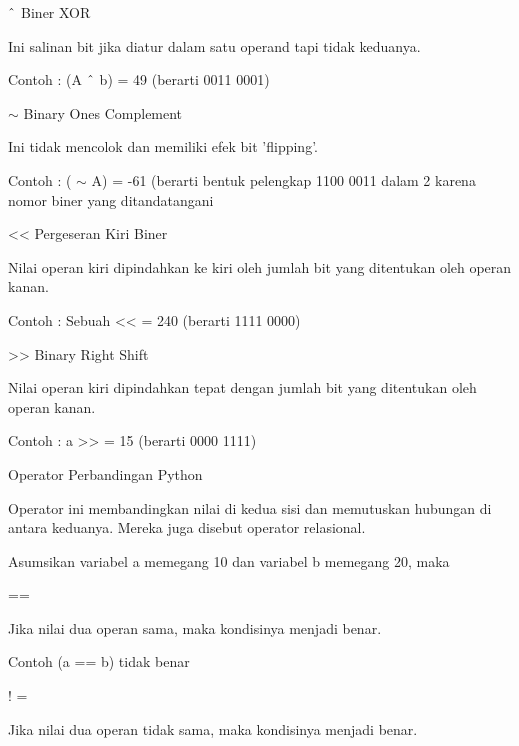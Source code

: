  $  \string^  $ Biner XOR \par
\noindent 
Ini salinan bit jika diatur dalam satu operand tapi tidak keduanya. \par
\noindent 
Contoh : (A  $  \string^  $ b) = 49 (berarti 0011 0001) \par
\vspace{12pt}
\noindent 
 $  \sim  $ Binary Ones Complement \par
\noindent 
Ini tidak mencolok dan memiliki efek bit 'flipping'. \par
\noindent 
Contoh : ( $  \sim  $ A) = -61 (berarti bentuk pelengkap 1100 0011 dalam 2 karena nomor biner yang ditandatangani \par
\vspace{12pt}
\noindent 
<< Pergeseran Kiri Biner \par
\noindent 
Nilai operan kiri dipindahkan ke kiri oleh jumlah bit yang ditentukan oleh operan kanan. \par
\noindent 
Contoh : Sebuah << = 240 (berarti 1111 0000) \par
\vspace{12pt}
\noindent 
>> Binary Right Shift \par
\noindent 
Nilai operan kiri dipindahkan tepat dengan jumlah bit yang ditentukan oleh operan kanan. \par
\noindent 
Contoh : a >> = 15 (berarti 0000 1111) \par
\vspace{12pt}
\noindent 
Operator Perbandingan Python \par
\vspace{12pt}
\noindent 
Operator ini membandingkan nilai di kedua sisi dan memutuskan hubungan di antara keduanya. $  $Mereka juga disebut operator relasional. \par
\vspace{12pt}
\noindent 
Asumsikan variabel a memegang 10 dan variabel b memegang 20, maka  \par
\vspace{12pt}
\noindent 
== \par
\noindent 
Jika nilai dua operan sama, maka kondisinya menjadi benar. \par
\noindent 
Contoh (a == b) tidak benar \par
\vspace{12pt}
\noindent 
! = \par
\noindent 
Jika nilai dua operan tidak sama, maka kondisinya menjadi benar. \par
\vspace{12pt}
